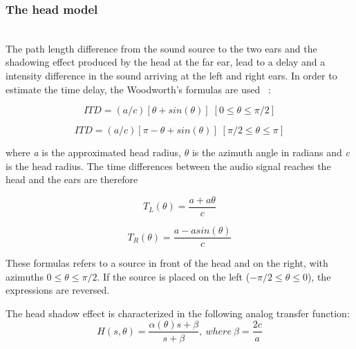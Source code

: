 \documentclass[journal]{IEEEtran}
\begin{document}
\subsubsection{The head model}~\\
The path length difference from the sound source to the two ears and the shadowing effect produced by the head at the far ear, lead to a delay and a intensity difference in the sound arriving at the left and right ears. In order to estimate the time delay, the Woodworth's formulas are used~\cite{Woodworth} :

\begin{equation}\label{eq:ITDfront}
ITD = (a/c)[\theta + sin(\theta)]   \; [0 \leq \theta \leq \pi/2]
\end{equation}

\begin{equation}\label{eq:ITDback}
ITD = (a/c)[\pi - \theta + sin(\theta)]  \; [\pi/2 \leq \theta \leq \pi]
\end{equation}


where \textit{a} is the approximated head radius, $\theta$ is the azimuth angle in radians and \textit{c} is the head radius. The time differences between the audio signal reaches the head and the ears are therefore

\begin{equation}\label{eq:ITDL}
T_{L} (\theta) = \frac{a+a\theta}{c}
\end{equation}

\begin{equation}\label{eq:ITDR}
T_{R} (\theta) = \frac{a-a sin(\theta)}{c}
\end{equation}

These formulas refers to a source in front of the head and on the right, with azimuths $0 \leq \theta \leq \pi/2$. If the source is placed on the left ($- \pi/2 \leq \theta \leq 0$), the expressions are reversed.



The head shadow effect is characterized in the following analog transfer function:
\begin{equation}\label{eq:analog}
H\left( s,\theta\right) = \frac{\alpha (\theta)s+\beta}{s+\beta},\: where\:\beta = \frac{2c}{a}
\end{equation}
\end{document}
